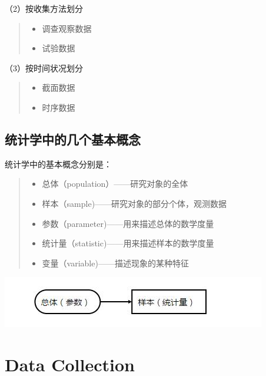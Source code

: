 \documentclass[]{ctexbook}
\providecommand{\tightlist}{%
  \setlength{\itemsep}{0pt}\setlength{\parskip}{0pt}}
\begin{document}
（2）按收集方法划分

\begin{quote}
\begin{itemize}
\tightlist
\item
  调查观察数据
\item
  试验数据
\end{itemize}
\end{quote}

（3）按时间状况划分

\begin{quote}
\begin{itemize}
\tightlist
\item
  截面数据
\item
  时序数据
\end{itemize}
\end{quote}

\hypertarget{ux7edfux8ba1ux5b66ux4e2dux7684ux51e0ux4e2aux57faux672cux6982ux5ff5}{%
\section{统计学中的几个基本概念}\label{ux7edfux8ba1ux5b66ux4e2dux7684ux51e0ux4e2aux57faux672cux6982ux5ff5}}

统计学中的基本概念分别是：

\begin{quote}
\begin{itemize}
\tightlist
\item
  总体（population）------研究对象的全体
\item
  样本（sample)------研究对象的部分个体，观测数据
\item
  参数（parameter)------用来描述总体的数学度量
\item
  统计量（statistic)------用来描述样本的数学度量
\item
  变量（variable)------描述现象的某种特征
\end{itemize}
\end{quote}

\includegraphics[width=0.6\linewidth,height=0.2\textheight]{fig/fig4}

\hypertarget{datacollec}{%
\chapter{Data Collection}\label{datacollec}}
\end{document}

